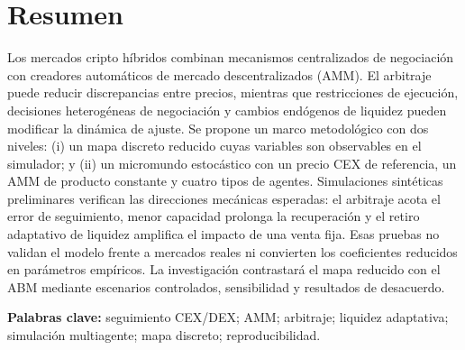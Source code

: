 \section{Resumen}

Los mercados cripto híbridos combinan mecanismos centralizados de negociación con
creadores automáticos de mercado descentralizados (AMM). El arbitraje puede reducir
discrepancias entre precios, mientras que restricciones de ejecución, decisiones
heterogéneas de negociación y cambios endógenos de liquidez pueden modificar la
dinámica de ajuste. Se propone un marco metodológico con dos niveles: (i) un mapa
discreto reducido cuyas variables son observables en el simulador; y (ii) un micromundo
estocástico con un precio CEX de referencia, un AMM de producto constante y cuatro
tipos de agentes. Simulaciones sintéticas preliminares verifican las direcciones
mecánicas esperadas: el arbitraje acota el error de seguimiento, menor capacidad
prolonga la recuperación y el retiro adaptativo de liquidez amplifica el impacto de una
venta fija. Esas pruebas no validan el modelo frente a mercados reales ni convierten los
coeficientes reducidos en parámetros empíricos. La investigación contrastará el mapa
reducido con el ABM mediante escenarios controlados, sensibilidad y resultados de
desacuerdo.

\textbf{Palabras clave:} seguimiento CEX/DEX; AMM; arbitraje; liquidez adaptativa;
simulación multiagente; mapa discreto; reproducibilidad.
